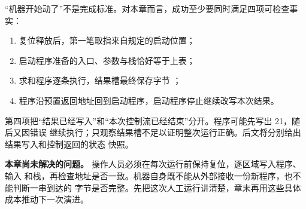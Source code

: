 “机器开始动了”不是完成标准。对本章而言，成功至少要同时满足四项可检查事实：

\begin{enumerate}
\item 复位释放后，第一笔取指来自规定的启动位置；
\item 启动程序准备的入口、参数与栈恰好等于上表；
\item 求和程序逐条执行，结果槽最终保存字节 ；
\item 程序沿预置返回地址回到启动程序，启动程序停止继续改写本次结果。
\end{enumerate}

第四项把“结果已经写入”和“本次控制流已经结束”分开。程序可能先写出 21，随后又因错误
继续执行；只观察结果槽不足以证明整次运行正确。后文将分别给出结果写入和控制返回的状态
快照。

\begin{problemframe}
\textbf{本章尚未解决的问题。} 操作人员必须在每次运行前保持复位，逐区域写入程序、输入
和栈，再检查地址是否一致。机器自身既不能从外部接收一份新程序，也不能判断一串到达的
字节是否完整。先把这次人工运行讲清楚，章末再用这些具体成本推动下一次演进。
\end{problemframe}
